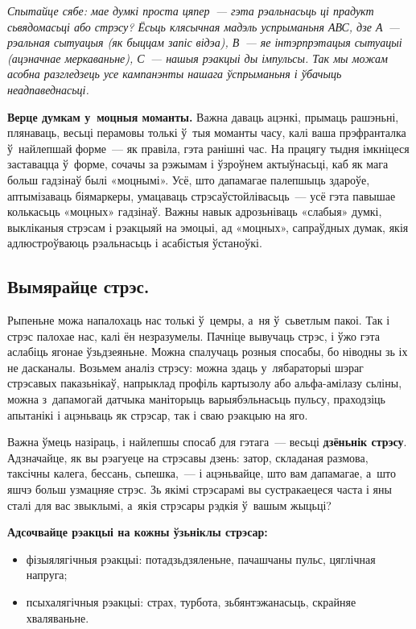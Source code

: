 \emph{Спытайце сябе: мае думкі проста цяпер~--- гэта рэальнасьць ці прадукт сьвядомасьці або стрэсу? Ёсьць клясычная мадэль успрыманьня АВС, дзе А~--- рэальная сытуацыя (як быццам запіс відэа), В~--- яе інтэрпрэтацыя сытуацыі (ацэначнае меркаваньне), С~--- нашыя рэакцыі ды імпульсы. Так мы можам асобна разгледзець усе кампанэнты нашага ўспрыманьня і ўбачыць неадпаведнасьці.}

\textbf{Верце думкам у~моцныя моманты.} Важна даваць ацэнкі, прымаць рашэньні, плянаваць, весьці перамовы толькі ў~тыя моманты часу, калі ваша прэфранталка ў~найлепшай форме~--- як правіла, гэта ранішні час. На працягу тыдня імкніцеся заставацца ў~форме, сочачы за рэжымам і ўзроўнем актыўнасьці, каб як мага больш гадзінаў былі «моцнымі». Усё, што дапамагае палепшыць здароўе, аптымізаваць біямаркеры, умацаваць стрэсаўстойлівасьць~--- усё гэта павышае колькасьць «моцных» гадзінаў. Важны навык адрозьніваць «слабыя» думкі, выкліканыя стрэсам і рэакцыяй на эмоцыі, ад «моцных», сапраўдных думак, якія адлюстроўваюць рэальнасьць і асабістыя ўстаноўкі.

\subsection*{Вымярайце стрэс.}

Рыпеньне можа напалохаць нас толькі ў~цемры, а~ня ў~сьветлым пакоі. Так і стрэс палохае нас, калі ён незразумелы. Пачніце вывучаць стрэс, і ўжо гэта аслабіць ягонае ўзьдзеяньне. Можна спалучаць розныя спосабы, бо ніводны зь іх не дасканалы. Возьмем аналіз стрэсу: можна здаць у~лябараторыі шэраг стрэсавых паказьнікаў, напрыклад профіль картызолу або альфа-амілазу сьліны, можна з~дапамогай датчыка маніторыць варыябэльнасьць пульсу, праходзіць апытанікі і ацэньваць як стрэсар, так і сваю рэакцыю на яго.

Важна ўмець назіраць, і найлепшы спосаб для гэтага~--- весьці \textbf{дзёньнік стрэсу}. Адзначайце, як вы рэагуеце на стрэсавы дзень: затор, складаная размова, таксічны калега, бессань, сьпешка,~--- і ацэньвайце, што вам дапамагае, а~што яшчэ больш узмацняе стрэс. Зь якімі стрэсарамі вы сустракаецеся часта і яны сталі для вас звыклымі, а~якія стрэсары рэдкія ў~вашым жыцьці? 

\textbf{Адсочвайце рэакцыі на кожны ўзьніклы стрэсар:} 
\begin{itemize}
  \item фізыялягічныя рэакцыі: потадзьдзяленьне, пачашчаны пульс, цяглічная напруга;
  \item псыхалягічныя рэакцыі: страх, турбота, зьбянтэжанасьць, скрайняе хваляваньне. 
\end{itemize}

